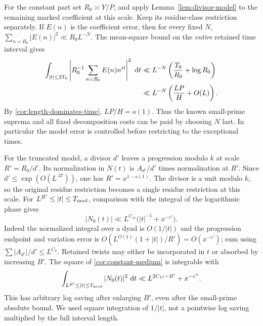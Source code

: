 For the constant part set $R_0\asymp Y/P$, and apply
Lemma~\ref{lem:divisor-model} to the remaining marked coefficient at
this scale.  Keep its residue-class restriction separately.  If $E(n)$
is the coefficient error, then for every fixed $N$,
$\sum_{n\asymp R_0}|E(n)|^2\ll R_0L^{-N}$.  The mean-square bound
on the \emph{entire} retained time interval gives
\begin{align}
 \int_{|t|\leq2T_0}
   \left|R_0^{-1}\sum_{n\asymp R_0}E(n)n^{it}\right|^2\,\,\mathrm d t
 &\ll L^{-N}\left(\frac{T_0}{R_0}+\log R_0\right)\notag\\
 &\ll L^{-N}\left(\frac{LP}{H}+O(L)\right).
 \label{cor:constant-model-error}
\end{align}
By \eqref{cor:length-dominates-time}, $LP/H=o(1)$.  Thus the known
small-prime suprema and all fixed decomposition costs can be paid by
choosing $N$ last.  In particular the model error is controlled before
restricting to the exceptional times.

For the truncated model, a divisor $d'$ leaves a progression modulo
$k$ at scale $R'=R_0/d'$.  Its normalization in $N(t)$ is
$A_{d'}/d'$ times normalization at $R'$.  Since
$d'\leq\exp(O(L^{.47}))$, one has $R'=x^{1-o(1)}$.  The divisor
is a unit modulo $k$, so the original residue restriction becomes a
single residue restriction at this scale.  For
$L^{B'}\leq|t|\leq T_{\rm mod}$, comparison with the integral of
the logarithmic phase gives
\begin{equation}\label{cor:constant-medium}
 |N_0(t)|\ll L^{C_{17}}\bigl(|t|^{-1}+x^{-c'}\bigr).
\end{equation}
Indeed the normalized integral over a dyad is $O(1/|t|)$ and the
progression endpoint and variation error is
$O(L^{O(1)}(1+|t|)/R')=O(x^{-c'})$; sum using
$\sum|A_{d'}|/d'\leq L^{C_8}$.  Retained twists may either be
incorporated in $t$ or absorbed by increasing $B'$.
The square of \eqref{cor:constant-medium} is integrable with
\begin{equation}\label{cor:constant-medium-integral}
 \int_{L^{B'}\leq|t|\leq T_{\rm mod}}|N_0(t)|^2\,\,\mathrm d t
       \ll L^{2C_{17}-B'}+x^{-c''}.
\end{equation}
This has arbitrary log saving after enlarging $B'$, even after the
small-prime absolute bound.  We used square integration of $1/|t|$,
not a pointwise log saving multiplied by the full interval length.

